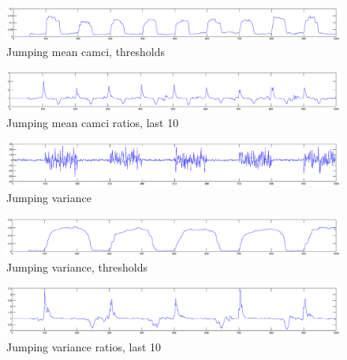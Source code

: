 \begin{figure}
\centering
  \includegraphics[width=1\textwidth]{./Figures/notes/jumping_mean_camci_thresholds.eps}
  \caption[Jumping mean camci thresholds]{Jumping mean camci, thresholds}
\end{figure}

\begin{figure}
\centering
  \includegraphics[width=1\textwidth]{./Figures/notes/jumping_mean_camci_ratios_10.eps}
  \caption[Jumping mean camci ratios]{Jumping mean camci ratios, last 10}
  \label{fig:jumping_mean_ratios}
\end{figure}

\begin{figure}
\centering
  \includegraphics[width=1\textwidth]{./Figures/notes/jumping_variance.eps}
  \caption[Jumping variance]{Jumping variance}
\end{figure}

\begin{figure}
\centering
  \includegraphics[width=1\textwidth]{./Figures/notes/jumping_variance_thresholds.eps}
  \caption[Jumping variance thresholds]{Jumping variance, thresholds}
\end{figure}

\begin{figure}
\centering
  \includegraphics[width=1\textwidth]{./Figures/notes/jumping_variance_ratios_10.eps}
  \caption[Jumping variance ratios]{Jumping variance ratios, last 10}
\end{figure}




